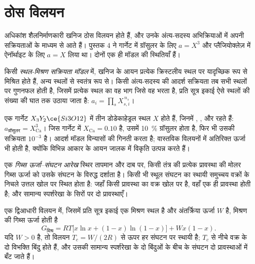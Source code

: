 \section{ठोस विलयन}\label{sec:b3:petrological-thermodynamics:solutions}

अधिकांश शैलनिर्माणकारी खनिज ठोस विलयन होते हैं, और उनके अंत्य-सदस्य
अभिक्रियाओं में अपनी सक्रियताओं के माध्यम से आते हैं। पुस्तक 4 ने गार्नेट में ग्रॉसुलर के लिए $a = X^3$
और प्लैजियोक्लेज़ में ऐनॉर्थाइट के लिए $a = X$ लिया था।
दोनों एक ही मॉडल की स्थितियाँ हैं।

\begin{definition}[स्थल-मिश्रण सक्रियता मॉडल]\label{def:b3:petrological-thermodynamics:site-mixing}
किसी \emph{स्थल-मिश्रण सक्रियता मॉडल} में, खनिज के आयन
प्रत्येक क्रिस्टलीय स्थल पर यादृच्छिक रूप से मिश्रित होते हैं, अन्य स्थलों से स्वतंत्र रूप से।
किसी अंत्य-सदस्य की आदर्श सक्रियता तब सभी स्थलों पर गुणनफल होती है, जिसमें
प्रत्येक स्थल का वह भाग जिसे वह भरता है, प्रति सूत्र इकाई ऐसे स्थलों की संख्या की घात तक उठाया जाता है:
$a_i = \prod_s X_{s,i}^{\,n_s}$।
\end{definition}

एक गार्नेट $X_3Y_2\ce{Si3O12}$ में तीन डोडेकाहेड्रल स्थल $X$ होते हैं,
जिनमें , ,  और  रहते हैं: $a_{\text{ग्रॉसुलर}} =
X_{\text{Ca}}^3$। जिस गार्नेट में $X_{\text{Ca}} = 0.10$ है, उसमें
\qty{10}{\percent} ग्रॉसुलर होता है, फिर भी उसकी सक्रियता $10^{-3}$ है। आदर्श
मॉडल विन्यासों की गिनती करता है; वास्तविक विलयनों में अतिरिक्त ऊर्जा भी होती है,
क्योंकि विभिन्न आकार के आयन जालक में विकृति उत्पन्न करते हैं।

\begin{definition}[गिब्स ऊर्जा--संघटन आरेख]\label{def:b3:petrological-thermodynamics:gx}
एक \emph{गिब्स ऊर्जा--संघटन आरेख}
स्थिर तापमान और दाब पर, किसी तंत्र की प्रत्येक प्रावस्था की मोलर गिब्स ऊर्जा
को उसके संघटन के विरुद्ध दर्शाता है। किसी भी स्थूल संघटन का स्थायी समुच्चय
वक्रों के निचले उत्तल खोल पर स्थित होता है: जहाँ किसी प्रावस्था का वक्र खोल पर है,
वहाँ एक ही प्रावस्था होती है; और सामान्य स्पर्शरेखा के सिरों पर दो प्रावस्थाएँ।
\end{definition}

\begin{proposition}[नियमित विलयन]\label{prop:b3:petrological-thermodynamics:regular}
एक द्विआधारी विलयन में, जिसमें प्रति सूत्र इकाई एक मिश्रण स्थल है और
अंतर्क्रिया ऊर्जा $W$ है, मिश्रण की गिब्स ऊर्जा होती है
\[
  G_{\text{मिश्र}} = RT\bigl[x\ln x + (1 - x)\ln(1 - x)\bigr] + Wx(1 - x).
\]
यदि $W > 0$ है, तो विलयन $T_c =
W/(2R)$ से ऊपर हर संघटन पर स्थायी है; $T_c$ से नीचे वक्र के दो विभक्ति बिंदु
होते हैं, और उसकी सामान्य स्पर्शरेखा के दो बिंदुओं के बीच के संघटन दो प्रावस्थाओं में बँट जाते हैं।
\end{proposition}

